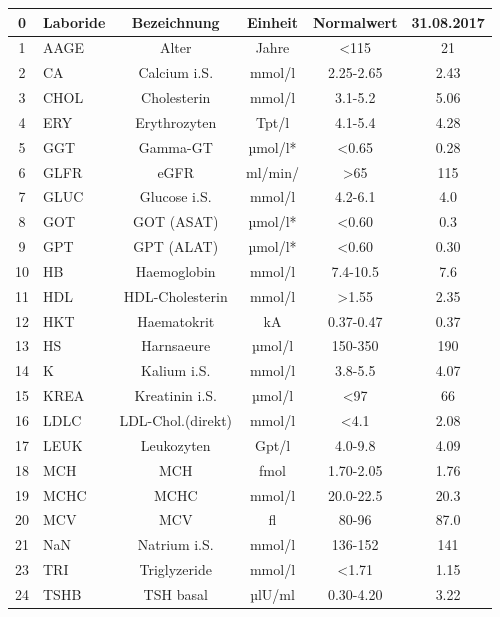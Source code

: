 \documentclass[a4paper,10pt,titlepage]{scrartcl}
\begin{document}
\begin{tabular}{c|l|c|c|c|c}
    0  & Laboride & Bezeichnung       & Einheit & Normalwert & 31.08.2017 \\\hline
    1  & AAGE     & Alter             & Jahre   & <115       & 21         \\
    2  & CA       & Calcium i.S.      & mmol/l  & 2.25-2.65  & 2.43       \\
    3  & CHOL     & Cholesterin       & mmol/l  & 3.1-5.2    & 5.06       \\
    4  & ERY      & Erythrozyten      & Tpt/l   & 4.1-5.4    & 4.28       \\
    5  & GGT      & Gamma-GT          & µmol/l* & <0.65      & 0.28       \\
    6  & GLFR     & eGFR              & ml/min/ & >65        & 115        \\
    7  & GLUC     & Glucose i.S.      & mmol/l  & 4.2-6.1    & 4.0        \\
    8  & GOT      & GOT (ASAT)        & µmol/l* & <0.60      & 0.3        \\
    9  & GPT      & GPT (ALAT)        & µmol/l* & <0.60      & 0.30       \\
    10 & HB       & Haemoglobin       & mmol/l  & 7.4-10.5   & 7.6        \\
    11 & HDL      & HDL-Cholesterin   & mmol/l  & >1.55      & 2.35       \\
    12 & HKT      & Haematokrit       & kA      & 0.37-0.47  & 0.37       \\
    13 & HS       & Harnsaeure        & µmol/l  & 150-350    & 190        \\
    14 & K        & Kalium i.S.       & mmol/l  & 3.8-5.5    & 4.07       \\
    15 & KREA     & Kreatinin i.S.    & µmol/l  & <97        & 66         \\
    16 & LDLC     & LDL-Chol.(direkt) & mmol/l  & <4.1       & 2.08       \\
    17 & LEUK     & Leukozyten        & Gpt/l   & 4.0-9.8    & 4.09       \\
    18 & MCH      & MCH               & fmol    & 1.70-2.05  & 1.76       \\
    19 & MCHC     & MCHC              & mmol/l  & 20.0-22.5  & 20.3       \\
    20 & MCV      & MCV               & fl      & 80-96      & 87.0       \\
    21 & NaN      & Natrium i.S.      & mmol/l  & 136-152    & 141        \\
    23 & TRI      & Triglyzeride      & mmol/l  & <1.71      & 1.15       \\
    24 & TSHB     & TSH basal         & µlU/ml  & 0.30-4.20  & 3.22       \\
\end{tabular}
\end{document}
